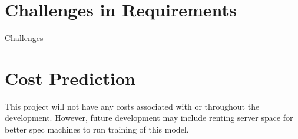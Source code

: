 \section{Challenges in Requirements}

Challenges

\section{Cost Prediction}

This project will not have any costs associated with or throughout the development. However, future development may include renting server space for better spec machines to run training of this model.